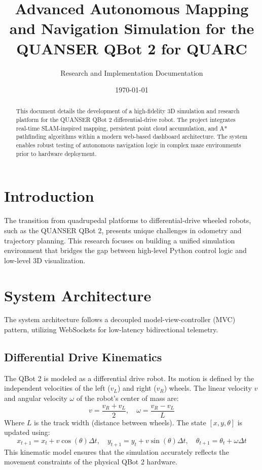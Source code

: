 \documentclass[12pt, a4paper]{article}
\title{\textbf{Advanced Autonomous Mapping and Navigation Simulation for the QUANSER QBot 2 for QUARC}}
\author{Research and Implementation Documentation}
\date{\today}
\begin{document}
\maketitle

\begin{abstract}
This document details the development of a high-fidelity 3D simulation and research platform for the QUANSER QBot 2 differential-drive robot. The project integrates real-time SLAM-inspired mapping, persistent point cloud accumulation, and A* pathfinding algorithms within a modern web-based dashboard architecture. The system enables robust testing of autonomous navigation logic in complex maze environments prior to hardware deployment.
\end{abstract}

\tableofcontents
\newpage

\section{Introduction}
The transition from quadrupedal platforms to differential-drive wheeled robots, such as the QUANSER QBot 2, presents unique challenges in odometry and trajectory planning. This research focuses on building a unified simulation environment that bridges the gap between high-level Python control logic and low-level 3D visualization.

\section{System Architecture}
The system architecture follows a decoupled model-view-controller (MVC) pattern, utilizing WebSockets for low-latency bidirectional telemetry.

\subsection{Differential Drive Kinematics}
The QBot 2 is modeled as a differential drive robot. Its motion is defined by the independent velocities of the left ($v_L$) and right ($v_R$) wheels. The linear velocity $v$ and angular velocity $\omega$ of the robot's center of mass are:
\begin{equation}
    v = \frac{v_R + v_L}{2}, \quad \omega = \frac{v_R - v_L}{L}
\end{equation}
Where $L$ is the track width (distance between wheels). The state $[x, y, \theta]$ is updated using:
\begin{equation}
    x_{t+1} = x_t + v \cos(\theta) \Delta t, \quad y_{t+1} = y_t + v \sin(\theta) \Delta t, \quad \theta_{t+1} = \theta_t + \omega \Delta t
\end{equation}
This kinematic model ensures that the simulation accurately reflects the movement constraints of the physical QBot 2 hardware.
\end{document}

